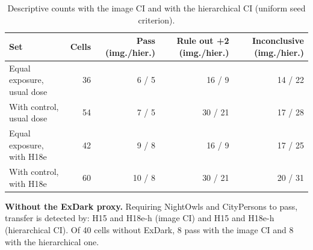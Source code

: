 \begin{table}[H]\centering\small
\caption{Descriptive counts with the image CI and with the hierarchical CI (uniform seed criterion).}
\begin{tabular}{@{}lrrrr@{}}\toprule
Set & Cells & Pass (img./hier.) & Rule out +2 (img./hier.) & Inconclusive (img./hier.) \\\midrule
Equal exposure, usual dose & 36 & 6 / 5 & 16 / 9 & 14 / 22 \\
With control, usual dose & 54 & 7 / 5 & 30 / 21 & 17 / 28 \\
Equal exposure, with H18e & 42 & 9 / 8 & 16 / 9 & 17 / 25 \\
With control, with H18e & 60 & 10 / 8 & 30 / 21 & 20 / 31 \\
\bottomrule\end{tabular}\end{table}

\noindent\textbf{Without the ExDark proxy.} Requiring NightOwls and CityPersons to pass, transfer is detected by: H15 and H18e-h (image CI) and H15 and H18e-h (hierarchical CI). Of 40 cells without ExDark, 8 pass with the image CI and 8 with the hierarchical one.
